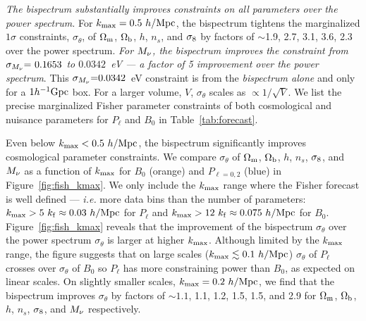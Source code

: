 {\em The bispectrum substantially improves constraints on all parameters 
over the power spectrum.} For $k_{\rm max} = 0.5~h/{\rm Mpc}$, the 
bispectrum tightens the marginalized $1\sigma$ constraints, $\sigma_\theta$, of $\Omega_{\rm m}$, 
$\Omega_{\rm b}$, $h$, $n_s$, and $\sigma_8$ by factors of $\sim$1.9, 2.7, 3.1, 3.6, 2.3 over 
the power spectrum. {\em For $M_\nu$, the bispectrum improves the constraint 
from $\sigma_{M_\nu}{=}~0.1653$ to $0.0342$~eV --- a factor of 5 improvement 
over the power spectrum}. This $\sigma_{M_\nu}{=}0.0342$~eV constraint is from 
the {\em bispectrum alone} and only for a $1h^{-1}{\rm Gpc}$ box. For a larger 
volume, $V$, $\sigma_\theta$ scales as $\propto1/\sqrt{V}$. We list the precise
marginalized Fisher parameter constraints of both cosmological and nuisance 
parameters for $P_\ell$ and $B_0$ in Table~\ref{tab:forecast}. 

Even below $k_{\rm max} < 0.5~h/{\rm Mpc}$, the bispectrum significantly 
improves cosmological parameter constraints. We compare $\sigma_\theta$ 
of $\Omega_{\rm m}$, $\Omega_{\rm b}$, $h$, $n_s$, $\sigma_8$, and $M_\nu$ as a function of $k_{\rm max}$ 
for $B_0$ (orange) and $P_{\ell = 0,2}$ (blue) in Figure~\ref{fig:fish_kmax}. We only 
include the $k_{\rm max}$ range where the Fisher forecast is well defined --- 
\emph{i.e.} more data bins than the number of parameters: $k_{\rm max} > 5~k_{\rm f} \approx 0.03~h/{\rm Mpc}$ 
for $P_\ell$ and $k_{\rm max} > 12~k_{\rm f} \approx 0.075~h/{\rm Mpc}$ for 
$B_0$. Figure~\ref{fig:fish_kmax} reveals that the improvement of the
bispectrum $\sigma_\theta$ over the power spectrum $\sigma_\theta$ is 
larger at higher $k_{\rm max}$. Although limited by the $k_{\rm max}$ range, 
the figure suggests that on large scales ($k_{\rm max}\lesssim 0.1~h/{\rm Mpc}$) 
$\sigma_\theta$ of $P_\ell$ crosses over $\sigma_\theta$ of $B_0$ so $P_\ell$ has more 
constraining power than $B_0$, as expected on linear scales. On slightly smaller 
scales, $k_{\rm max} = 0.2~h/{\rm Mpc}$, we find that the bispectrum improves 
$\sigma_\theta$ by factors of 
$\sim 1.1$, 1.1, 1.2, 1.5, 1.5, and 2.9 for $\Omega_{\rm m}$, $\Omega_{\rm b}$, $h$, $n_s$, $\sigma_8$, 
and $M_\nu$ respectively. 

